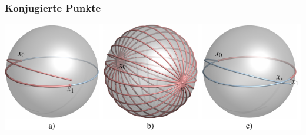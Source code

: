 %
%
%
\bgroup
\begin{frame}[t]
\setlength{\abovedisplayskip}{5pt}
\setlength{\belowdisplayskip}{5pt}
\frametitle{Konjugierte Punkte}
\begin{center}
\includegraphics[width=\textwidth]{../slides/7/jacobi.pdf}
\end{center}
\end{frame}
\egroup
